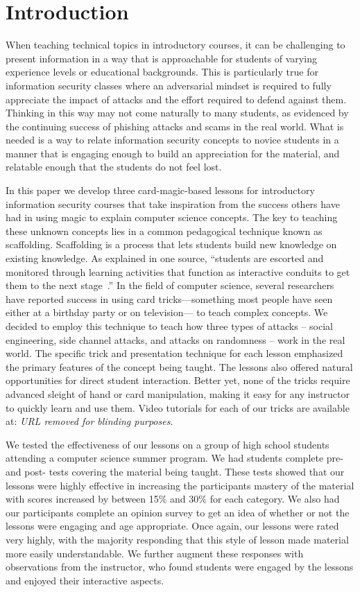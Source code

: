 \section{Introduction}
\label{SEC:introduction}

When teaching technical topics
in introductory courses,
it can be challenging
to present information
in a way that is approachable
for students of varying
experience levels
or educational backgrounds.
This is particularly true
for information security classes
where an adversarial mindset
is required
to fully appreciate the impact of attacks and the effort required to
defend against them.
Thinking in this way
may not come naturally
to many students,
as evidenced
by the continuing success of phishing attacks
and scams in the real world.
What is needed
is a way
to relate information security concepts
to novice students
in a manner
that is engaging enough
to build an appreciation for the material,
and relatable enough that the students do not feel lost.

In this paper
we develop three card-magic-based lessons
for introductory information security courses
that take inspiration
from the success others have had
in using magic
to explain computer science concepts.
The key to teaching these unknown concepts
lies in a common pedagogical technique
known as scaffolding.
Scaffolding is a process that lets students build
new knowledge on existing knowledge.
As explained in one source,
``students are escorted and monitored through learning
activities that function as interactive conduits to get
them to the next stage~\cite{raymond2000}.''
In the field of computer science,
several researchers have reported success in using card
tricks—something most people
have seen either at a birthday party
or on television— to teach complex concepts.
We decided to employ this technique to teach how three types
of attacks -- social engineering, side channel attacks, and attacks on
randomness -- work in the real world.
The specific trick and presentation technique
for each lesson emphasized the primary
features of the concept being taught.
The lessons also offered natural opportunities
for direct student interaction.
Better yet, none of the tricks require advanced sleight of hand
or card manipulation,
making it easy for any instructor to quickly learn and use them.
Video tutorials for each of our tricks are available at: \textit{URL removed
for blinding purposes}.


We tested the effectiveness of our lessons on
a group of high school students
attending a computer science summer program.
We had students complete pre- and post- tests covering the
material being taught.  These tests showed that our lessons were highly
effective in increasing the participants mastery of the material with scores
increased by between 15\% and 30\% for each category.
We also had our participants complete an opinion survey to get an idea of
whether or not the lessons were engaging and age appropriate.  Once again, our
lessons were rated very highly,
with the majority responding that this style of lesson made material
more easily understandable.
We further augment these responses
with observations
from the instructor,
who found students were engaged by the lessons and enjoyed their interactive
aspects.



